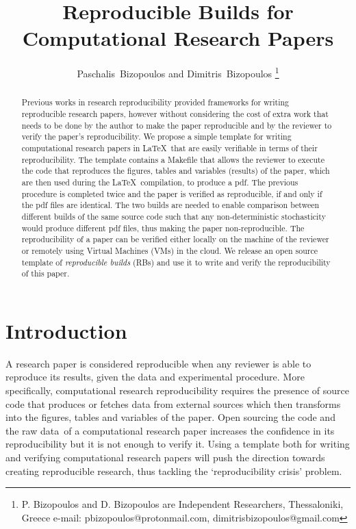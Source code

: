 \documentclass[journal]{IEEEtran}
\begin{document}

\title{Reproducible Builds for\\ Computational Research Papers}

\author{Paschalis~Bizopoulos and Dimitris~Bizopoulos
\thanks{P. Bizopoulos and D. Bizopoulos are Independent Researchers, Thessaloniki, Greece e-mail: pbizopoulos@protonmail.com, dimitrisbizopoulos@gmail.com}}

\maketitle

\begin{abstract}
	Previous works in research reproducibility provided frameworks for writing reproducible research papers, however without considering the cost of extra work that needs to be done by the author to make the paper reproducible and by the reviewer to verify the paper's reproducibility.
	We propose a simple template for writing computational research papers in \LaTeX\ that are easily verifiable in terms of their reproducibility.
	The template contains a Makefile that allows the reviewer to execute the code that reproduces the figures, tables and variables (results) of the paper, which are then used during the \LaTeX\ compilation, to produce a pdf.
	The previous procedure is completed twice and the paper is verified as reproducible, if and only if the pdf files are identical.
	The two builds are needed to enable comparison between different builds of the same source code such that any non-deterministic stochasticity would produce different pdf files, thus making the paper non-reproducible.
	The reproducibility of a paper can be verified either locally on the machine of the reviewer or remotely using Virtual Machines (VMs) in the cloud.
	We release an open source template of \textit{reproducible builds} (RBs) and use it to write and verify the reproducibility of this paper.
\end{abstract}

\section{Introduction}
A research paper is considered reproducible when any reviewer is able to reproduce its results, given the data and experimental procedure.
More specifically, computational research reproducibility requires the presence of source code that produces or fetches data from external sources which then transforms into the figures, tables and variables of the paper.
Open sourcing the code and the raw data of a computational research paper increases the confidence in its reproducibility but it is not enough to verify it.
Using a template both for writing and verifying computational research papers will push the direction towards creating reproducible research, thus tackling the `reproducibility crisis' problem.
\end{document}
